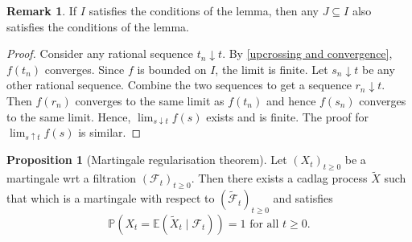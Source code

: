 \documentclass[parskip=full]{article}
\theoremstyle{definition}
\newtheorem{proposition}{Proposition}[section]
\newtheorem*{remark}{Remark}
\newcommand{\Pbb}{\mathbb{P}}
\newcommand{\1}{\mathbbm{1}}
\newcommand{\E}{\mathbb{E}}
\begin{document}
\begin{remark}
  If $I$ satisfies the conditions of the lemma, then any $J \subseteq I$ also satisfies the conditions of the lemma.
\end{remark}

\begin{proof}
  Consider any rational sequence $t_n \downarrow t$. By \ref{upcrossing and convergence}, $f(t_n)$ converges. Since $f$ is bounded on $I$, the limit is finite. Let $s_n \downarrow t$ be any other rational sequence. Combine the two sequences to get a sequence $r_n \downarrow t$. Then $f(r_n)$ converges to the same limit as $f(t_n)$ and hence $f(s_n)$ converges to the same limit. Hence, $\lim_{s \downarrow t} f(s)$ exists and is finite. The proof for $\lim_{s \uparrow t} f(s)$ is similar.
\end{proof}

\begin{proposition}[Martingale regularisation theorem]
  Let $(X_t)_{t \geq 0}$ be a martingale wrt a filtration $(\mathcal{F}_t)_{t \geq 0}$. Then there exists a cadlag process $\tilde{X}$ such that which is a martingale with respect to $(\tilde{\mathcal{F}}_t)_{t \geq 0}$ and satisfies
  \[
    \Pbb(X_t = \E(\tilde{X}_t \mid \mathcal{F}_t)) = 1 \text{ for all } t \geq 0.
  \]
\end{proposition}
\end{document}

